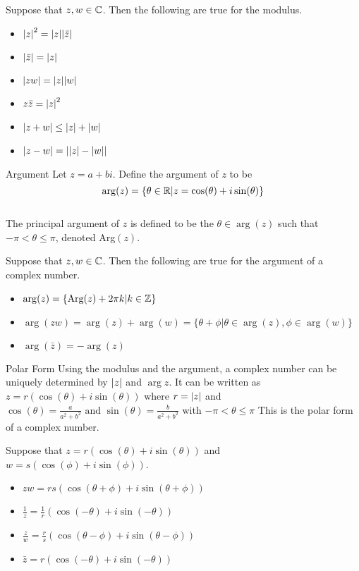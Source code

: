 \documentclass[a4paper]{article}
\begin{document}
\begin{prp}{}{} Suppose that $z,w\in\mathbb{C}$. Then the following are true for the modulus. 
\begin{itemize}
\item $\abs{z}^2=\abs{z}\abs{\bar{z}}$
\item $\abs{\bar{z}}=\abs{z}$
\item $\abs{zw}=\abs{z}\abs{w}$
\item $z\bar{z}=\abs{z}^2$
\item $\abs{z+w}\leq\abs{z}+\abs{w}$
\item $\abs{z-w}=\abs*{\abs{z}-\abs{w}}$
\end{itemize}
\end{prp}

\begin{defn}{Argument}{} Let $z=a+bi$. Define the argument of $z$ to be $$\arg(z)=\{\theta\in\mathbb{R}|z=\cos(\theta)+i\sin(\theta)\}$$~\\
The principal argument of $z$ is defined to be the $\theta\in\arg(z)$ such that $-\pi<\theta\leq\pi$, denoted Arg$(z)$. 
\end{defn}

\begin{prp}{}{} Suppose that $z,w\in\mathbb{C}$. Then the following are true for the argument of a complex number. 
\begin{itemize}
\item $\arg(z)=\{\text{Arg}(z)+2\pi k|k\in\mathbb{Z}\}$
\item $\arg{(zw)}=\arg{(z)}+\arg{(w)}=\{\theta+\phi|\theta\in\arg(z), \phi\in\arg(w)\}$
\item $\arg{(\bar{z})}=-\arg{(z)}$
\end{itemize}
\end{prp}

\begin{defn}{Polar Form}{} Using the modulus and the argument, a complex number can be uniquely determined by $\abs{z}$ and $\arg{z}$. It can be written as $z=r(\cos{(\theta)}+i\sin{(\theta)})$ where $r=\abs{z}$ and $\cos{(\theta)}=\frac{a}{a^2+b^2}\text{  and  }\sin{(\theta)}=\frac{b}{a^2+b^2}$ with $-\pi<\theta\leq\pi$ This is the polar form of a complex number. 
\end{defn}

\begin{prp}{}{} Suppose that $z=r(\cos{(\theta)}+i\sin{(\theta)})$ and $w=s(\cos{(\phi)}+i\sin{(\phi)})$. 
\begin{itemize}
\item $zw=rs(\cos{(\theta+\phi)}+i\sin{(\theta+\phi)})$
\item $\frac{1}{z}=\frac{1}{r}(\cos{(-\theta)}+i\sin{(-\theta)})$
\item $\frac{z}{w}=\frac{r}{s}(\cos{(\theta-\phi)}+i\sin{(\theta-\phi)})$
\item $\bar{z}=r(\cos{(-\theta)}+i\sin{(-\theta)})$
\end{itemize}
\end{prp}
\end{document}
